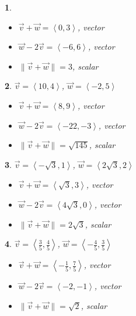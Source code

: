 \documentclass{amsbook}
\newtheorem{exc}{}
\newenvironment{ex}{\begin{exc}\normalfont}{\end{exc}}
\numberwithin{section}{chapter}
\numberwithin{equation}{chapter}
\begin{document}
\begin{multicols}{2}
\begin{ex}
\begin{sol}
\begin{itemize}
				\item  $\vec{v} + \vec{w} = \left<0,3\right> $, vector
				\item  $\vec{w}  - 2\vec{v}  = \left<-6,6 \right>$, vector
				
				\item $\| \vec{v} + \vec{w} \| = 3$, scalar
			\end{itemize}
			

	\end{sol}
\end{ex}

\begin{ex}
	 $\vec{v} = \left<10, 4 \right>$, $\vec{w} = \left<-2, 5 \right>$
	\begin{sol}
		\begin{itemize}
			
			\item  $\vec{v} + \vec{w} = \left<8,9\right> $, vector
			\item  $\vec{w}  - 2\vec{v}  = \left<-22, -3 \right>$, vector
			\item $\| \vec{v} + \vec{w} \| = \sqrt{145}$, scalar
			
		\end{itemize}
	
	\end{sol}
\end{ex}

\begin{ex}
	 $\vec{v} = \left<-\sqrt{3}, 1\right>$, $\vec{w} = \left<2\sqrt{3}, 2\right>$
	\begin{sol}
			\begin{itemize}
				
				\item  $\vec{v} + \vec{w} = \left<\sqrt{3},3\right> $, vector
				\item  $\vec{w}  - 2\vec{v}  = \left<4\sqrt{3}, 0 \right>$, vector
				\item $\| \vec{v} + \vec{w} \| = 2\sqrt{3}$, scalar
		
			\end{itemize}
		\end{sol}
\end{ex}

\begin{ex}
	$\vec{v} = \left<\frac{3}{5}, \frac{4}{5}\right>$, $\vec{w} = \left<-\frac{4}{5}, \frac{3}{5}\right>$
	\begin{sol}
			\begin{itemize}
				
				\item  $\vec{v} + \vec{w} = \left<-\frac{1}{5},\frac{7}{5}\right> $, vector
				\item  $\vec{w}  - 2\vec{v}  = \left<-2, -1 \right>$, vector
				\item $\| \vec{v} + \vec{w} \| = \sqrt{2}$, scalar
				
			\end{itemize}
	\end{sol}
\end{ex}

\end{multicols}
\end{document}
